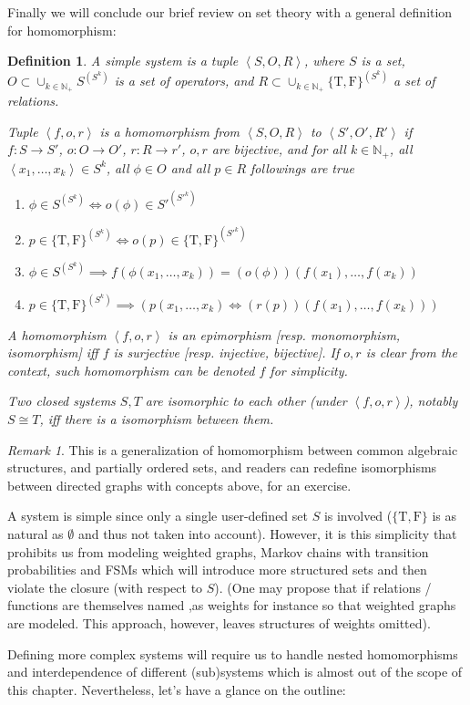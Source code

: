 \documentclass{book}
\newtheorem{definition}{Definition}
\theoremstyle{definition}\newtheorem{mechanism}{Mechanism}
\theoremstyle{remark}\newtheorem*{remark}{Remark}
\newcommand{\true}{\mathrm{T}}
\newcommand{\false}{\mathrm{F}}
\begin{document}
Finally we will conclude our brief review on set theory with a general definition for homomorphism:

\begin{definition}\label{def:closed-system-hom}
	A simple system is a tuple $\left<S, O, R\right>$, where $S$ is a set, $O \subset \cup_{k\in \mathbb N_+} S^{(S^k)}$ is a set of operators, and $R\subset \cup_{k\in \mathbb N_+} \{\true, \false\}^{(S^k)}$ a set of relations.
	
	Tuple $\left<f, o, r\right>$ is a homomorphism from $\left<S, O, R\right>$ to $\left<S', O', R'\right>$ if $f: S\to S'$, $o: O\to O'$, $r: R\to r'$, $o, r$ are bijective, and for all $k\in \mathbb N_+$, all $\left<x_1, \dots, x_k\right>\in S^k$, all $\phi \in O$ and all $p\in R$ followings are true
	
	\begin{enumerate}
		\item $\phi\in S^{(S^k)}\iff o(\phi)\in S'^{(S'^k)}$
		\item $p\in \{\true, \false\}^{(S^k)} \iff o(p)\in \{\true, \false\}^{(S'^k)}$
		\item $\phi\in S^{(S^k)}\implies f(\phi(x_1, \dots, x_k)) = (o(\phi))(f(x_1), \dots, f(x_k))$
		\item $p\in \{\true, \false\}^{(S^k)}\implies (p(x_1, \dots, x_k) \iff (r(p))(f(x_1), \dots, f(x_k)))$
	\end{enumerate}
	
	A homomorphism $\left<f, o ,r\right>$ is an epimorphism [resp. monomorphism, isomorphism] iff $f$ is surjective [resp. injective, bijective]. If $o, r$ is clear from the context, such homomorphism can be denoted $f$ for simplicity.
	
	Two closed systems $S, T$ are isomorphic to each other (under $\left<f, o, r\right>$), notably $S\cong T$, iff there is a isomorphism between them.
\end{definition}

\begin{remark}
	This is a generalization of homomorphism between common algebraic structures, and partially ordered sets, and readers can redefine isomorphisms between directed graphs with concepts above, for an exercise.
	
	A system is simple since only a single user-defined set $S$ is involved ($\{\true, \false\}$ is as natural as $\emptyset$ and thus not taken into account). However, it is this simplicity that prohibits us from modeling weighted graphs, Markov chains with transition probabilities and FSMs which will introduce more structured sets and then violate the closure (with respect to $S$). (One may propose that if relations / functions are themselves named ,as weights for instance so that weighted graphs are modeled. This approach, however, leaves structures of weights omitted). 
	
	Defining more complex systems will require us to handle nested homomorphisms and interdependence of different (sub)systems which is almost out of the scope of this chapter. Nevertheless, let's have a glance on the outline:
\end{remark}
\end{document}
